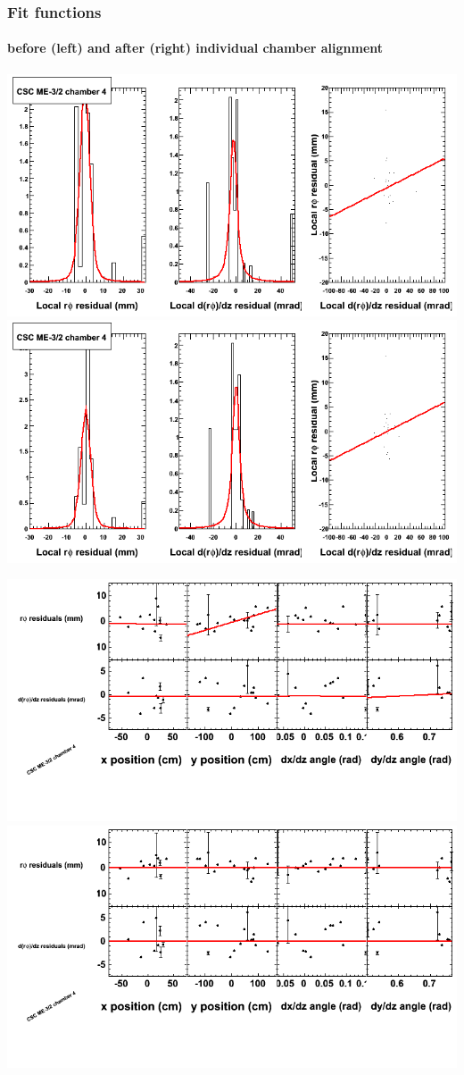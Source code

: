 \documentclass[compress]{beamer}
\begin{document}
\begin{frame}
\frametitle{Fit functions}
\framesubtitle{before (left) and after (right) individual chamber alignment}
\includegraphics[width=0.5\linewidth]{ringfits_3dof/beforefit_MEm32_04_bellcurve.png} \includegraphics[width=0.5\linewidth]{ringfits_3dof/afterfit_MEm32_04_bellcurve.png}

\includegraphics[width=0.5\linewidth]{ringfits_3dof/beforefit_MEm32_04_polynomials.png} \includegraphics[width=0.5\linewidth]{ringfits_3dof/afterfit_MEm32_04_polynomials.png}
\end{frame}
\end{document}
